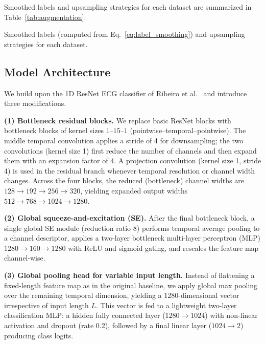 Smoothed labels and upsampling strategies for each dataset are summarized in Table~\ref{tab:augmentation}.


\begin{table}[!htp]
\centering

\caption{Smoothed labels (computed from Eq.~\ref{eq:label_smoothing}) and upsampling strategies for each dataset.}
\label{tab:augmentation}
\end{table}


\subsection{Model Architecture}
\label{subsec:model}


We build upon the 1D ResNet ECG classifier of Ribeiro et al.~\cite{ribeiro2020automatic} and introduce three modifications.

\textbf{(1) Bottleneck residual blocks.} We replace basic ResNet blocks with bottleneck blocks of kernel sizes $1$–$15$–$1$ (pointwise--temporal--pointwise). The middle temporal convolution applies a stride of 4 for downsampling; the two convolutions (kernel size 1) first reduce the number of channels and then expand them with an expansion factor of 4. A projection convolution (kernel size 1, stride 4) is used in the residual branch whenever temporal resolution or channel width changes. Across the four blocks, the reduced (bottleneck) channel widths are $128 \to 192 \to 256 \to 320$, yielding expanded output widths $512 \to 768 \to 1024 \to 1280$.

\textbf{(2) Global squeeze-and-excitation (SE).} After the final bottleneck block, a single global SE module (reduction ratio 8) \cite{hu2018senet} performs temporal average pooling to a channel descriptor, applies a two-layer bottleneck multi-layer perceptron (MLP) $1280 \to 160 \to 1280$ with ReLU and sigmoid gating, and rescales the feature map channel-wise.

\textbf{(3) Global pooling head for variable input length.} Instead of flattening a fixed-length feature map as in the original baseline, we apply global max pooling over the remaining temporal dimension, yielding a 1280-dimensional vector irrespective of input length $L$. This vector is fed to a lightweight two-layer classification MLP: a hidden fully connected layer ($1280 \to 1024$) with non-linear activation and dropout (rate 0.2), followed by a final linear layer ($1024 \to 2$) producing class logits.

